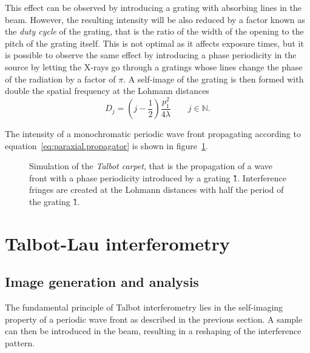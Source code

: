 This effect can be observed by introducing a grating with absorbing lines in
the beam. However, the resulting intensity will be also reduced by a factor
known as the \emph{duty cycle} of the grating, that is the ratio of the
width of the opening to the pitch of the grating itself. This is not optimal
as it affects exposure times, but it is possible to observe the same effect
by introducing a phase periodicity in the source by letting the X-rays
go through a gratings whose lines change the phase of the radiation by a
factor of $\pi$. A self-image of the grating is then formed with double the
spatial frequency at the Lohmann distances~\cite{Lohmann1971}
\begin{equation}
    D_j = \left(j - \frac{1}{2}\right) \frac{p_1^2}{4 \lambda} \qquad
    j\in\mathbb{N}.\label{eq:lohmann-distance}
\end{equation}

The intensity of a monochromatic periodic wave front propagating according to
equation~\eqref{eq:paraxial.propagator} is shown in
figure~\ref{fig:talbotcarpet}.

\begin{figure}[htb]
    \centering
    
    \caption[Talbot carpet.]{Simulation of the \emph{Talbot carpet},
    that is the propagation of a wave front with a phase periodicity
    introduced by a grating \G1.
    Interference fringes are created at the Lohmann distances with half the
period of the grating \G1.}
    \label{fig:talbotcarpet}
\end{figure}

\section{Talbot-Lau interferometry}
\subsection{Image generation and analysis}\label{sec:gi-image-analysis}
The fundamental principle of Talbot interferometry lies in the self-imaging
property of a periodic wave front as described in the previous section. A
sample can then be introduced in the beam, resulting in a reshaping of the
interference pattern.

